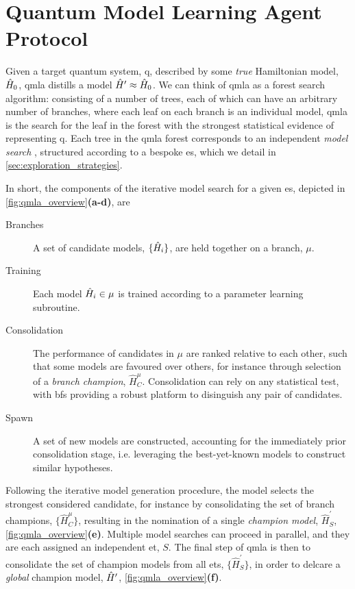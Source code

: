 \section{Quantum Model Learning Agent Protocol}\label{sec:qmla_protocol}
Given a target quantum system, \gls{q}, described by some \emph{true} Hamiltonian model, $\hat{H}_0$, 
    \gls{qmla} distills a model $\hat{H}^{\prime} \approx \hat{H}_0$.
We can think of \gls{qmla} as a forest search algorithm\footnotemark:
    consisting of a number of trees, each of which can have an arbitrary number of branches, 
    where each leaf on each branch is an individual model, 
    \gls{qmla} is the search for the leaf in the forest with the 
    strongest statistical evidence of representing \gls{q}. 
Each tree in the \gls{qmla} forest corresponds to an independent \emph{ \gls{model search} }, 
    structured according to a bespoke \gls{es}, which we detail in \cref{sec:exploration_strategies}. 
\par 
In short, the components of the iterative \gls{model search} for a given \gls{es}, 
    depicted in \cref{fig:qmla_overview}\textbf{(a-d)}, are
\begin{description}
    \item[Branches] A set of candidate models, $\{ \hat{H}_i \}$, are held together on a branch, $\mu$. 
    \item[Training] Each model $\hat{H}_i \in \mu$ is trained according to a parameter learning subroutine.
    \item[Consolidation] The performance of candidates in $\mu$ are ranked relative to each other, 
        such that some models are favoured over others, for instance through selection of a \emph{branch champion}, $\hat{H}_C^{\mu}$. 
        Consolidation can rely on any statistical test, with \glspl{bf} providing a robust platform to disinguish 
        any pair of candidates.
    \item[Spawn] A set of new models are constructed, accounting for the immediately prior consolidation stage, 
        i.e. leveraging the best-yet-known models to construct similar hypotheses.
\end{description}

Following the iterative model generation procedure, the model selects the strongest considered candidate,
    for instance by consolidating the set of branch champions, $\{\hat{H}_C^{\mu} \}$,
    resulting in the nomination of a single \emph{champion model}, $\hat{H}_{S}^{\prime}$, \cref{fig:qmla_overview}\textbf{(e)}.
Multiple model searches can proceed in parallel, and they are each assigned an independent \gls{et}, $S$. 
The final step of \gls{qmla} is then to consolidate the set of champion models from all \glspl{et}, $\{\hat{H}_{S}^{\prime} \}$, 
    in order to delcare a \emph{global} \gls{champion model}, $\hat{H}^{\prime}$, \cref{fig:qmla_overview}\textbf{(f)}. 

